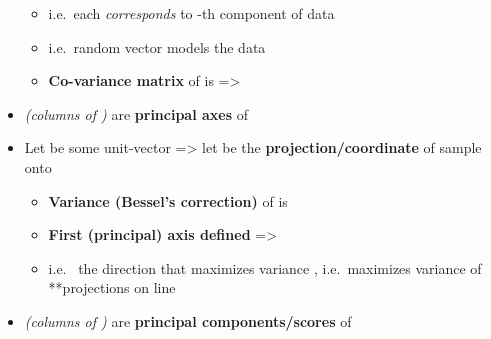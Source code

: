 \begin{itemize}
\begin{itemize}
                  \item
                        i.e.~each  \emph{corresponds} to -th component
                        of data
                  \item
                        i.e.~random vector  models the
                        data 
                  \item
                        \textbf{Co-variance matrix} of  is
                         =\textgreater{}
            \end{itemize}
      \item
             \emph{(columns of
                  )} are \textbf{principal axes} of 
      \item
            Let  be some unit-vector
            =\textgreater{} let
             be the
            \textbf{projection/coordinate} of sample  onto

            \begin{itemize}

                  \item
                        \textbf{Variance (Bessel's correction)} of
                         is
                  \item
                        \textbf{First (principal) axis defined} =\textgreater{}
                  \item
                        i.e.~ the direction that maximizes
                        variance , i.e.~maximizes
                        variance of **projections on line
            \end{itemize}
      \item
            \emph{(columns of )} are \textbf{principal
                  components/scores} of 


\end{itemize}
